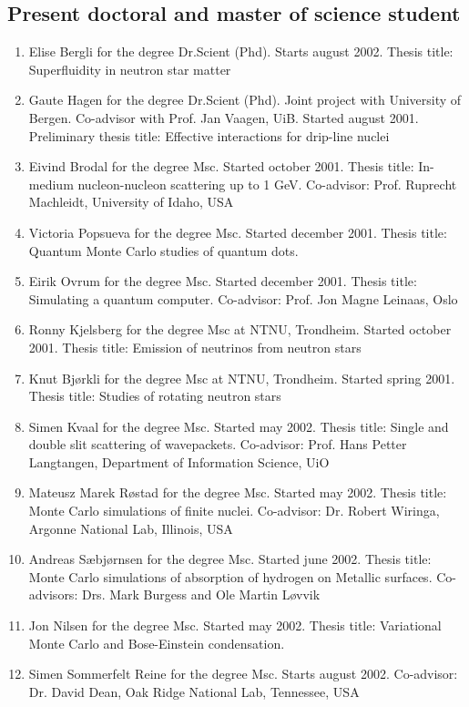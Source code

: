 \subsection*{Present doctoral and master of science student}
\begin{enumerate}
\item  Elise Bergli for the degree Dr.Scient (Phd). 
            Starts  august 2002.
            Thesis title: Superfluidity in neutron star matter
      \item   Gaute Hagen for the degree Dr.Scient (Phd). Joint project with
            University of Bergen. Co-advisor with Prof. Jan Vaagen, UiB.
            Started  august 2001.
            Preliminary thesis title: Effective interactions for drip-line nuclei
\item 
   Eivind Brodal for the degree Msc. Started  october 2001.
            Thesis title: In-medium nucleon-nucleon scattering up to
            1 GeV. Co-advisor: Prof. Ruprecht Machleidt, University of
            Idaho, USA
      \item   Victoria Popsueva for the degree Msc. Started  december 2001.
            Thesis title: Quantum Monte Carlo studies of quantum dots.
      \item    Eirik Ovrum for the degree Msc. Started  december 2001.
            Thesis title: Simulating a quantum computer.
            Co-advisor: Prof. Jon Magne Leinaas, Oslo
      \item    Ronny Kjelsberg for the degree Msc at NTNU, Trondheim.
            Started  october 2001. 
            Thesis title: Emission of neutrinos from neutron stars
      \item    Knut Bj\o rkli for the degree Msc at NTNU, Trondheim.
            Started  spring 2001.
            Thesis title: Studies of rotating neutron stars
      \item   Simen Kvaal for the degree Msc.
            Started may 2002.
            Thesis title: Single and double slit
            scattering of wavepackets. Co-advisor: Prof. Hans Petter Langtangen,
            Department of Information Science, UiO
\item      Mateusz Marek R\o stad for the degree Msc. Started  may 2002.
            Thesis title: Monte Carlo simulations of finite nuclei. Co-advisor:
            Dr. Robert Wiringa, Argonne National Lab, Illinois, USA
\item      Andreas S\ae bj\o rnsen for the degree Msc. Started  june 2002.
           Thesis title: Monte Carlo simulations of absorption of hydrogen on
           Metallic surfaces. Co-advisors: Drs. Mark Burgess and  
           Ole Martin L\o vvik
\item      Jon Nilsen for the degree Msc. Started  may 2002.
            Thesis title: Variational Monte Carlo and Bose-Einstein condensation.
\item      Simen Sommerfelt Reine for the degree Msc. Starts august 2002.
           Co-advisor: Dr. David Dean, Oak Ridge National Lab, Tennessee, USA
\end{enumerate}
